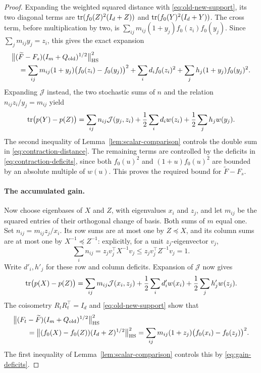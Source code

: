 \begin{proof}
Expanding the weighted squared distance with
\eqref{eq:old-new-support}, its two diagonal terms are
$\operatorname{tr}(f_0(Z)^2(I_d+Z))$ and $\operatorname{tr}(f_0(Y)^2(I_d+Y))$.
The cross term, before multiplication by two, is
$\sum_{ij}m_{ij}(1+y_j)f_0(z_i)f_0(y_j)$.  Since
$\sum_jm_{ij}y_j=z_i$, this gives the exact expansion
\begin{equation}
 \begin{split}
 &\bigl\lVert(\widetilde F-F_s)
                  (I_m+Q_{\rm old})^{1/2}\bigr\rVert_{\mathrm{HS}}^2\\
 &\quad=\sum_{ij}m_{ij}(1+y_j)
                   \bigl(f_0(z_i)-f_0(y_j)\bigr)^2
       +\sum_i d_i f_0(z_i)^2
       +\sum_j h_j(1+y_j)f_0(y_j)^2.
 \end{split}
 \label{eq:contraction-distance}
\end{equation}
Expanding $\mathcal J$ instead, the two stochastic sums of $n$
and the relation $n_{ij}z_i/y_j=m_{ij}$ yield
\begin{equation}
 \operatorname{tr}\bigl(p(Y)-p(Z)\bigr)
  =\sum_{ij}n_{ij}\mathcal J(y_j,z_i)
    +\frac12\sum_i d_i w(z_i)
    +\frac12\sum_j h_j w(y_j).
 \label{eq:contraction-deficits}
\end{equation}
The second inequality of Lemma~\ref{lem:scalar-comparison} controls
the double sum in \eqref{eq:contraction-distance}.  The remaining
terms are controlled by the deficits in
\eqref{eq:contraction-deficits}, since both $f_0(u)^2$ and
$(1+u)f_0(u)^2$ are bounded by an absolute multiple of $w(u)$.
This proves the required bound for $\widetilde F-F_s$.

\paragraph{The accumulated gain.}
Now choose eigenbases of $X$ and $Z$, with eigenvalues $x_i$ and
$z_j$, and let $m_{ij}$ be the squared entries of their orthogonal
change of basis.  Both sums of $m$ equal one.  Set
$n_{ij}=m_{ij}z_j/x_i$.  Its row sums are at most one by
$Z\preceq X$, and its column sums are at most one by
$X^{-1}\preceq Z^{-1}$: explicitly, for a unit $z_j$-eigenvector
$v_j$,
\[
 \sum_i n_{ij}=z_jv_j^\top X^{-1}v_j
       \le z_jv_j^\top Z^{-1}v_j=1.
\]
Write $d'_i,h'_j$ for these row and column deficits.  Expansion of
$\mathcal J$ now gives
\begin{equation}
 \operatorname{tr}\bigl(p(X)-p(Z)\bigr)
  =\sum_{ij}m_{ij}\mathcal J(x_i,z_j)
    +\frac12\sum_i d'_i w(x_i)
    +\frac12\sum_j h'_j w(z_j).
 \label{eq:gain-deficits}
\end{equation}
The coisometry $R_tR_t^\top=I_d$ and
\eqref{eq:old-new-support} show that
\begin{align*}
 &\bigl\lVert(F_t-\widetilde F)
                   (I_m+Q_{\rm old})^{1/2}\bigr\rVert_{\mathrm{HS}}^2\\
 &\qquad=\bigl\lVert(f_0(X)-f_0(Z))(I_d+Z)^{1/2}
                           \bigr\rVert_{\mathrm{HS}}^2
   =\sum_{ij}m_{ij}(1+z_j)\bigl(f_0(x_i)-f_0(z_j)\bigr)^2.
\end{align*}
The first inequality of Lemma~\ref{lem:scalar-comparison} controls
this by \eqref{eq:gain-deficits}.


\end{proof}
